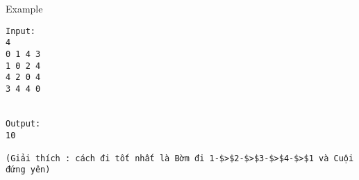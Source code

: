 Example
\begin{verbatim}
Input:
4
0 1 4 3
1 0 2 4
4 2 0 4
3 4 4 0


Output:
10

(Giải thích : cách đi tốt nhất là Bờm đi 1-$>$2-$>$3-$>$4-$>$1 và Cuội đứng yên)
\end{verbatim}